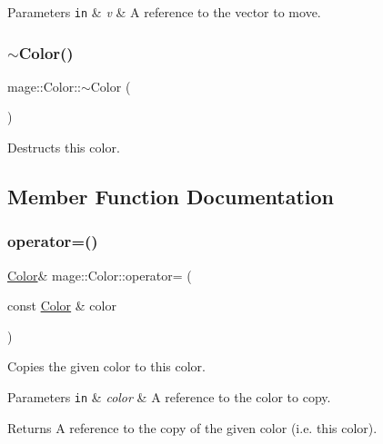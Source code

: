 \begin{DoxyParams}[1]{Parameters}
\mbox{\tt in}  & {\em v} & A reference to the vector to move. \\
\hline
\end{DoxyParams}
\hypertarget{structmage_1_1_color_aa4df1c9718b7846adf77fbeed79ac219}{}\label{structmage_1_1_color_aa4df1c9718b7846adf77fbeed79ac219} 
\subsubsection{\texorpdfstring{$\sim$\+Color()}{~Color()}}
{\footnotesize\ttfamily mage\+::\+Color\+::$\sim$\+Color (\begin{DoxyParamCaption}{ }\end{DoxyParamCaption})\hspace{0.3cm}{\ttfamily [default]}}

Destructs this color. 

\subsection{Member Function Documentation}
\hypertarget{structmage_1_1_color_a194847cf864911d7ceff16aabec1459f}{}\label{structmage_1_1_color_a194847cf864911d7ceff16aabec1459f} 
\subsubsection{\texorpdfstring{operator=()}{operator=()}\hspace{0.1cm}{\footnotesize\ttfamily [1/2]}}
{\footnotesize\ttfamily \hyperlink{structmage_1_1_color}{Color}\& mage\+::\+Color\+::operator= (\begin{DoxyParamCaption}\item[{const \hyperlink{structmage_1_1_color}{Color} \&}]{color }\end{DoxyParamCaption})\hspace{0.3cm}{\ttfamily [default]}}

Copies the given color to this color.


\begin{DoxyParams}[1]{Parameters}
\mbox{\tt in}  & {\em color} & A reference to the color to copy. \\
\hline
\end{DoxyParams}
\begin{DoxyReturn}{Returns}
A reference to the copy of the given color (i.\+e. this color). 
\end{DoxyReturn}
\hypertarget{structmage_1_1_color_aa16160a9b8a03a8b2d82569343dd8c6d}{}\label{structmage_1_1_color_aa16160a9b8a03a8b2d82569343dd8c6d} 
